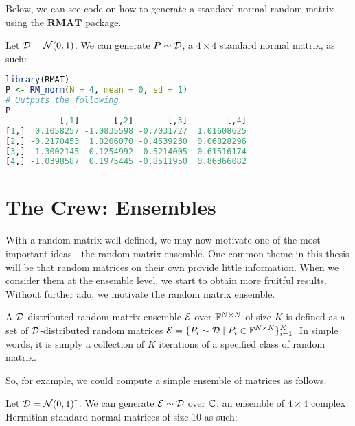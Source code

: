 \medskip
\noindent Below, we can see code on how to generate a standard normal random matrix using the $\textbf{RMAT}$ package.
\begin{code}
Let $\mathcal{D} = \mathcal{N}(0,1)$. We can generate $P \sim \mathcal{D}$, a $4 \times 4$ standard normal matrix, as such:
\end{code}

\begin{lstlisting}[language=R]
library(RMAT)
P <- RM_norm(N = 4, mean = 0, sd = 1)
# Outputs the following
P
           [,1]       [,2]       [,3]        [,4]
[1,]  0.1058257 -1.0835598 -0.7031727  1.01608625
[2,] -0.2170453  1.8206070 -0.4539230  0.06828296
[3,]  1.3002145  0.1254992 -0.5214005 -0.61516174
[4,] -1.0398587  0.1975445 -0.8511950  0.86366082
\end{lstlisting}


\newpage


\section{The Crew: Ensembles}

With a random matrix well defined, we may now motivate one of the most important ideas - the random matrix ensemble. One common theme in this thesis will be that random matrices on their own provide little information. When we consider them at the ensemble level, we start to obtain more fruitful results. Without further ado, we motivate the random matrix ensemble.

\begin{definition}
A $\mathcal{D}$-distributed random matrix ensemble $\mathcal{E}$ over $\mathbb{F}^{N \times N}$ of size $K$ is defined as a set of $\mathcal{D}$-distributed random matrices $\mathcal{E} = \{P_i \sim \mathcal{D} \mid P_i \in \mathbb{F}^{N \times N}\}_{i = 1}^K$. In simple words, it is simply a collection of $K$ iterations of a specified class of random matrix.
\end{definition}

\medskip
\noindent So, for example, we could compute a simple ensemble of matrices as follows.
\begin{code}
Let $\mathcal{D} = \mathcal{N}(0,1)^{\dagger}$. We can generate $\mathcal{E} \sim \mathcal{D}$ over $\mathbb{C}$, an ensemble of $4 \times 4$ complex Hermitian standard normal matrices of size 10 as such:
\end{code}

